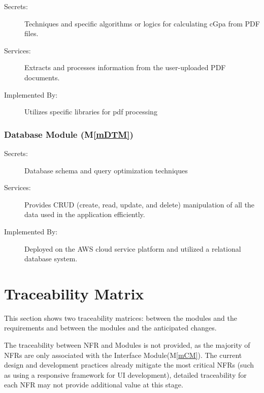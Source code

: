 \documentclass[12pt, titlepage]{article}
\newcommand{\mref}[1]{M\ref{#1}}
\begin{document}
\begin{description}
\item[Secrets:] Techniques and specific algorithms or logics for calculating cGpa from PDF files. 
\item[Services:] Extracts and processes information from the user-uploaded PDF documents.
\item[Implemented By:] Utilizes specific libraries for pdf processing
\end{description}

\subsubsection{Database Module (\mref{mDTM})}

\begin{description}
\item[Secrets:] Database schema and query optimization techniques
\item[Services:] Provides CRUD (create, read, update, and delete) manipulation of all the data used in the application efficiently. 
\item[Implemented By:] Deployed on the AWS cloud service platform and utilized a relational database system.  
\end{description}

\section{Traceability Matrix} \label{SecTM}

This section shows two traceability matrices: between the modules and the
requirements and between the modules and the anticipated changes.

The traceability between NFR and Modules is not provided, as the majority of NFRs are only associated with the Interface Module(\mref{mCM}).  The current design and development practices already mitigate the most critical NFRs (such as using a responsive framework for UI development), detailed traceability for each NFR may not provide additional value at this stage.
\end{document}
